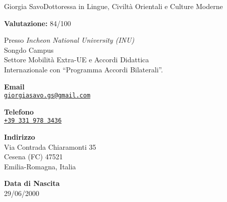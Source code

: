 \documentclass{article}
\begin{document}
\begin{cv}[avatar]{Giorgia Savo}{Dottoressa in Lingue, Civiltà Orientali e Culture Moderne}
\begin{cvevent}[Settembre 2014][Luglio 2019]
	\textbf{Valutazione:} 84/100
\end{cvevent}


\begin{cvevent}[Marzo 2022][Luglio 2022]
    Presso \textit{Incheon National University (INU)}\\ Songdo Campus\\
    Settore Mobilità Extra-UE e Accordi Didattica\\
    Internazionale con “Programma Accordi Bilaterali”.
\end{cvevent}

\cvseparator[2]
\begin{cvevent}[2014]
\end{cvevent}

\cvsidebar %



\begin{cvitem}[Envelope][4]
    \textbf{Email}\\
    \href{mailto:}{\texttt{giorgiasavo.gs@gmail.com}}
\end{cvitem}

\cvseparator[3]
\begin{cvitem}[Phone][5]
    \textbf{Telefono}\\
    \href{tel:+393319783436}{\texttt{+39 331 978 3436}}
\end{cvitem}

\cvseparator[3]
\begin{cvitem}[Home][5]
    \textbf{Indirizzo}\\
    Via Contrada Chiaramonti 35\\ Cesena (FC) 47521\\ Emilia-Romagna, Italia
\end{cvitem}

\cvseparator[3]
\begin{cvitem}[BirthdayCake][5]
    \textbf{Data di Nascita}\\
    29/06/2000
\end{cvitem}


\end{cv}
\end{document}
